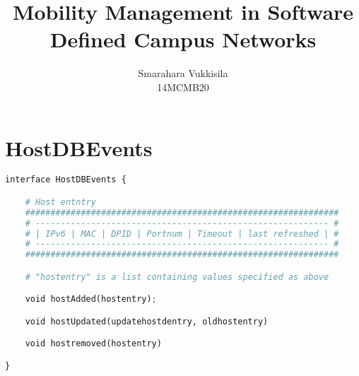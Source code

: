 \documentclass[10pt,a4paper,titlepage]{report}
\author{Smarahara Vukkisila\\ 14MCMB20}
\title{Mobility Management in Software Defined Campus Networks}
\begin{document}
	\lstset{style=mystyle}
	
	\renewcommand{\caption}{\textbf{def }}
	\renewcommand{\algorithmicforall}{\textbf{foreach }}
	\renewcommand{\in}{\textbf{ in }}
	\newcommand{\eq}{\textbf{\textit{ eq }}}
	\newcommand{\gt}{ > }
	\newcommand{\lt}{ < }
	\newcommand{\CONTINUE}{\textbf{\\ continue \\ }}
	
	\maketitle
	
	\section{HostDBEvents}
		\begin{lstlisting}[language=Python]
interface HostDBEvents {

    # Host entntry
    ##############################################################
    # ---------------------------------------------------------- #
    # | IPv6 | MAC | DPID | Portnum | Timeout | last refreshed | #
    # ---------------------------------------------------------- #
    ##############################################################

    # "hostentry" is a list containing values specified as above

	void hostAdded(hostentry);

	void hostUpdated(updatehostdentry, oldhostentry)

	void hostremoved(hostentry)

}
		\end{lstlisting}
		
\end{document}
